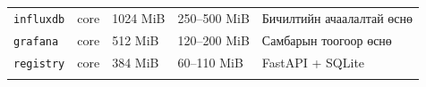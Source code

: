 \begin{longtable}[]{@{}lllll@{}}
\begin{minipage}[t]{0.17\columnwidth}\raggedright
\texttt{influxdb}\strut
\end{minipage} & \begin{minipage}[t]{0.17\columnwidth}\raggedright
core\strut
\end{minipage} & \begin{minipage}[t]{0.17\columnwidth}\raggedright
1024 MiB\strut
\end{minipage} & \begin{minipage}[t]{0.17\columnwidth}\raggedright
250--500 MiB\strut
\end{minipage} & \begin{minipage}[t]{0.17\columnwidth}\raggedright
Бичилтийн ачаалалтай өснө\strut
\end{minipage}\tabularnewline
\begin{minipage}[t]{0.17\columnwidth}\raggedright
\texttt{grafana}\strut
\end{minipage} & \begin{minipage}[t]{0.17\columnwidth}\raggedright
core\strut
\end{minipage} & \begin{minipage}[t]{0.17\columnwidth}\raggedright
512 MiB\strut
\end{minipage} & \begin{minipage}[t]{0.17\columnwidth}\raggedright
120--200 MiB\strut
\end{minipage} & \begin{minipage}[t]{0.17\columnwidth}\raggedright
Самбарын тоогоор өснө\strut
\end{minipage}\tabularnewline
\begin{minipage}[t]{0.17\columnwidth}\raggedright
\texttt{registry}\strut
\end{minipage} & \begin{minipage}[t]{0.17\columnwidth}\raggedright
core\strut
\end{minipage} & \begin{minipage}[t]{0.17\columnwidth}\raggedright
384 MiB\strut
\end{minipage} & \begin{minipage}[t]{0.17\columnwidth}\raggedright
60--110 MiB\strut
\end{minipage} & \begin{minipage}[t]{0.17\columnwidth}\raggedright
FastAPI + SQLite\strut
\end{minipage}\tabularnewline
\begin{minipage}[t]{0.17\columnwidth}\raggedright

\end{minipage}
\end{longtable}
